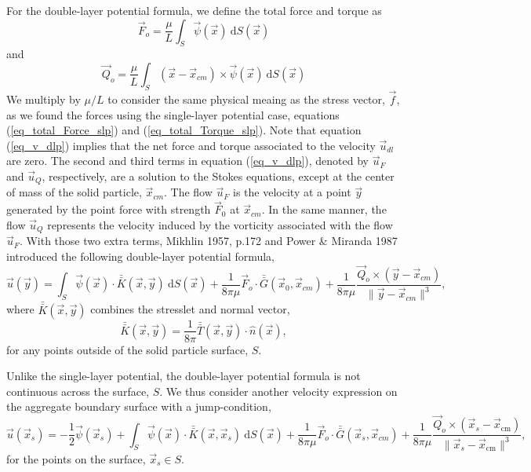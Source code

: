 For the double-layer potential formula, we define the total force and torque as
\begin{equation}
 \vec{F}_o
  = \frac{\mu}{L} \int_S \vec{\psi}(\vec{x}) \  \text{d}S(\vec{x})
 \label{eq_total_Force_dlp}
 \end{equation} 
 and
 \begin{equation}
 \vec{Q}_o 
 = \frac{\mu}{L} \int_S (\vec{x} - \vec{x}_{cm}) \times \vec{\psi}(\vec{x})  \ \text{d}S(\vec{x})
 \label{eq_total_Torque_dlp}
 \end{equation}
%
We multiply by $\mu / L$ to consider the same physical meaing as the stress vector, $\vec{f}$, as we found the forces using the single-layer potential case, equations (\ref{eq_total_Force_slp}) and (\ref{eq_total_Torque_slp}).
Note that equation (\ref{eq_v_dlp}) implies that the net force and torque associated to the velocity $\vec{u}_{dl}$ are zero.
The second and third terms in equation (\ref{eq_v_dlp}), denoted by $\vec{u}_F$ and $\vec{u}_Q$, respectively, are a solution to the Stokes equations, except at the center of mass of the solid particle, $\vec{x}_{cm}$.
The flow $\vec{u}_F$ is the velocity at a point $\vec{y}$ generated by the point force with strength $\vec{F}_0$ at $\vec{x}_{cm}$. 
In the same manner, the flow $\vec{u}_Q$ represents the velocity induced by the vorticity associated with the flow $\vec{u}_F$.
With those two extra terms, Mikhlin 1957, p.172 \cite{smithies_integral_1959} and Power \& Miranda 1987 \cite{power_second_1987} introduced the following double-layer potential formula,
\begin{equation}
\vec{u}(\vec{y}) = \int_S
\vec{\psi}(\vec{x}) \cdot  \bar{\bar{K}}(\vec{x},\vec{y})  \ \text{d}S(\vec{x}) + 
\frac{1}{8 \pi \mu }\vec{F}_o \cdot \bar{\bar{G}}(\vec{x}_{0},\vec{x}_{cm})
+\frac{1}{8 \pi \mu } \frac{\vec{Q}_o \times  (\vec{y}   - \vec{x}_{cm} ) }{\| \vec{y}   - \vec{x}_{cm} \|^3 },
 \label{eq_BI_DL}
\end{equation}
where $ \bar{\bar{K}}(\vec{x},\vec{y})$ combines the stresslet and normal vector,
\begin{equation*}
	\bar{\bar{K}}(\vec{x},\vec{y})
	= \frac{1}{8 \pi} \bar{\bar{T}}(\vec{x},\vec{y})  \cdot \hat{n}(\vec{x}),
\end{equation*}
for any points outside of the solid particle surface, $S$.

\par
Unlike the single-layer potential, the double-layer potential formula is not continuous across the surface, $S$.
We thus consider another velocity expression on the aggregate boundary surface with a jump-condition,
\begin{equation}
\vec{u}(\vec{x}_s) = -\frac{1}{2} \vec{\psi}(\vec{x}_s) 
+\int_S  \vec{\psi}(\vec{x})  \cdot \bar{\bar{K}} (\vec{x},\vec{x}_s) \ \text{d}S(\vec{x}) 
+\frac{1}{8 \pi \mu } \vec{F}_o \cdot \bar{\bar{G}}(\vec{x}_{s},\vec{x}_{cm})
+\frac{1}{8 \pi \mu } \frac{\vec{Q}_o \times  (\vec{x}_s   - \vec{x}_{\text{cm}} ) }{\| \vec{x}_s  - \vec{x}_{\text{cm}} \|^3 },
\label{eq_BI_DL_on}
\end{equation}
for the points on the surface, $\vec{x}_s \in S$.
